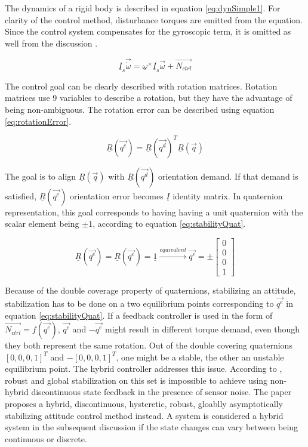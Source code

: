 The dynamics of a rigid body is described in equation \ref{eq:dynSimple1}. For clarity of the control method, disturbance torques are emitted from the equation. Since the control system compensates for the gyroscopic term, it is omitted as well from the discussion .

\begin{equation}
\label{eq:dynSimple1}
\underline{I}_s \vec{\dot{\omega}} = \underline{\omega}^\times \underline{I}_s \vec{\omega} + \vec{N_{ctrl}}
\end{equation}

The control goal can be clearly described with rotation matrices. Rotation matrices use 9 variables to describe a rotation, but they have the advantage of being non-ambiguous. The rotation error can be described using equation \ref{eq:rotationError}. 

\begin{equation}
\label{eq:rotationError}
\underline{R}(\vec{q^e}) = \underline{R}(\vec{q^d})^T \underline{R}(\vec{q})
\end{equation}

The goal is to align $\underline{R}(\vec{q})$ with $\underline{R}(\vec{q^d})$ orientation demand. If that demand is satisfied, $\underline{{R}}(\vec{q^e})$ orientation error becomes $\underline{I}$ identity matrix. In quaternion representation, this goal corresponds to having having a unit quaternion with the scalar element being $\pm 1$, according to equation \ref{eq:stabilityQuat}. 

\begin{equation}
\label{eq:stabilityQuat}
\underline{R}(\vec{q^e}) = \underline{R}(\vec{q^e}) = \underline{1} \xrightarrow{equivalent} \vec{q^e}  = \pm	\begin{bmatrix}
0 \\
0 \\
0 \\
1
\end{bmatrix} 	
\end{equation}

Because of the double coverage property of quaternions, stabilizing an attitude, stabilization has to be done on a two equilibrium points corresponding to $\vec{q^e}$ in equation \ref{eq:stabilityQuat}. If a feedback controller is used in the form of $\vec{N_{ctrl}} = f(\vec{q^e})$, $\vec{q^e}$ and $-\vec{q^e}$ might result in different torque demand, even though they both represent the same rotation. Out of the double covering quaternions $[0, 0, 0, 1]^T$ and $-[0, 0, 0, 1]^T$, one might be a stable, the other an unstable equilibrium point. The hybrid controller addresses this issue. According to \cite{globalAttController}, robust and global stabilization on this set is impossible to achieve using non-hybrid discontinuous state feedback in the presence of sensor noise. The paper proposes a hybrid, discontinuous, hysteretic, robust, gloablly asymptotically stabilizing attitude control method instead. A system is considered a hybrid system in the subsequent discussion if the state changes can vary between being continuous or discrete.


